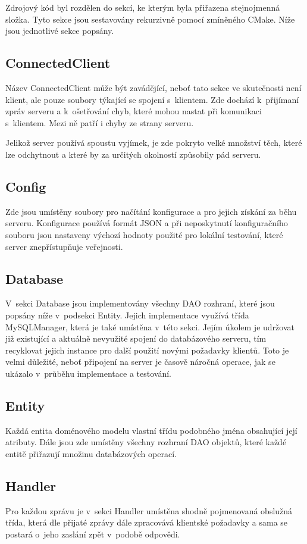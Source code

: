 \documentclass[thesis=B,czech]{FITthesis}[2013/10/20]
\begin{document}
Zdrojový kód byl rozdělen do sekcí, ke kterým byla přiřazena stejnojmenná složka. Tyto sekce jsou sestavovány rekurzivně pomocí zmíněného CMake. Níže jsou jednotlivé sekce popsány. 

\subsection{ConnectedClient}
Název ConnectedClient může být zavádějící, neboť tato sekce ve skutečnosti není klient, ale pouze soubory týkající se spojení s~klientem. Zde dochází k~přijímaní zpráv serveru a k~ošetřování chyb, které mohou nastat při komunikaci s~klientem. Mezi ně patří i chyby ze strany serveru.

Jelikož server používá spoustu vyjímek, je zde pokryto velké množství těch, které lze odchytnout a které by za určitých okolností způsobily pád serveru.

\subsection{Config}
Zde jsou umístěny soubory pro načítání konfigurace a pro jejich získání za běhu serveru. Konfigurace používá formát JSON a při neposkytnutí konfiguračního souboru jsou nastaveny výchozí hodnoty použité pro lokální testování, které server znepřístupňuje veřejnosti.

\subsection{Database}
V~sekci Database jsou implementovány všechny DAO rozhraní, které jsou popsány níže v~podsekci Entity. Jejich implementace využívá třída MySQLManager, která je také umístěna v~této sekci. Jejím úkolem je udržovat již existující a aktuálně nevyužité spojení do databázového serveru, tím recyklovat jejich instance pro další použití novými požadavky klientů. Toto je velmi důležité, neboť připojení na server je časově náročná operace, jak se ukázalo v~průběhu implementace a testování.

\subsection{Entity}
Každá entita doménového modelu vlastní třídu podobného jména obsahující její atributy. Dále jsou zde umístěny všechny rozhraní DAO objektů, které každé entitě přiřazují množinu databázových operací.

\subsection{Handler}
Pro každou zprávu je v~sekci Handler umístěna shodně pojmenovaná obslužná třída, která dle přijaté zprávy dále zpracovává klientské požadavky a sama se postará o~jeho zaslání zpět v~podobě odpovědi.
\end{document}
